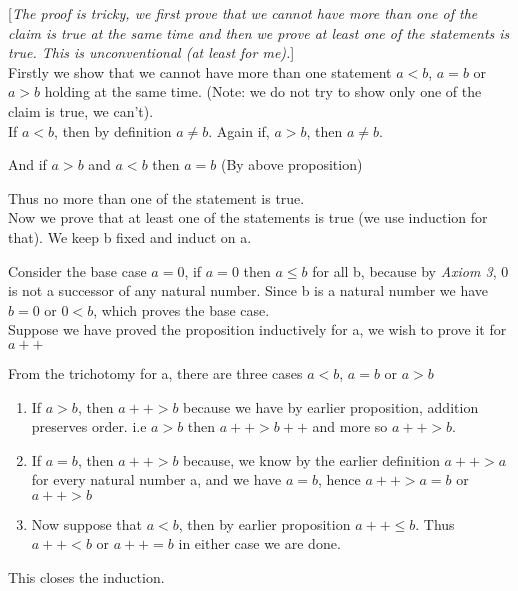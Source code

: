 \documentclass[10pt]{article}
\begin{document}
[\emph{The proof is tricky, we first prove that we cannot have more than one of
    the claim is true at the same time and then we prove at least one of the
    statements is true. This is unconventional (at least for me).}]
\\[5pt]
Firstly we show that we cannot have more than one statement $a < b$, $a = b$
or $a > b$ holding at the same time. (Note: we do not try to show only one of
the claim is true, we can't).
\\[3pt]
If $a < b$, then by definition $a \ne b$. Again if, $a > b$, then $a \ne b$.

And if $a>b$ and $a<b$ then $a = b$ (By above proposition)

Thus no more than one of the statement is true.
\\[4pt]
Now we prove that at least one of the statements is true (we use induction for
that). We keep b fixed and induct on a.

Consider the base case $a = 0$, if $a=0$ then $a \leq b$ for all b, because by
\emph{Axiom 3}, 0 is not a successor of any natural number. Since b is a natural
number we have $b=0$ or $0<b$, which proves the base case.
\\[4pt]
Suppose we have proved the proposition inductively for a, we wish to prove it
for $a++$

From the trichotomy for a, there are three cases $a < b$, $a = b$ or $a > b$
\begin{enumerate}
\item If $a>b$, then $a++ > b$ because we have by earlier proposition, addition
  preserves order. i.e $a>b$ then $a++ > b++$ and more so $a++ > b$.

\item If $a = b$, then $a++ > b$ because, we know by the earlier definition $a++
  > a$ for every natural number a, and we have $a=b$, hence $a++>a=b$ or $a++>b$

\item Now suppose that $a<b$, then by earlier proposition $a++ \leq b$. Thus
  $a++<b$ or $a++=b$ in either case we are done.
\end{enumerate}
This closes the induction.
\end{document}
